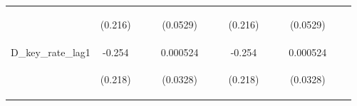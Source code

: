 \documentclass[]{article}
\begin{document}
\begin{center}
\begin{tabular}{lcccccccccccc}
\vspace{4pt} & \begin{footnotesize}(0.216)\end{footnotesize} & \begin{footnotesize}\end{footnotesize} & \begin{footnotesize}\end{footnotesize} & \begin{footnotesize}(0.0529)\end{footnotesize} & \begin{footnotesize}\end{footnotesize} & \begin{footnotesize}\end{footnotesize} & \begin{footnotesize}(0.216)\end{footnotesize} & \begin{footnotesize}\end{footnotesize} & \begin{footnotesize}\end{footnotesize} & \begin{footnotesize}(0.0529)\end{footnotesize} & \begin{footnotesize}\end{footnotesize} & \begin{footnotesize}\end{footnotesize} \\
D\_key\_rate\_lag1 & -0.254 &  &  & 0.000524 &  &  & -0.254 &  &  & 0.000524 &  &  \\
\vspace{4pt} & \begin{footnotesize}(0.218)\end{footnotesize} & \begin{footnotesize}\end{footnotesize} & \begin{footnotesize}\end{footnotesize} & \begin{footnotesize}(0.0328)\end{footnotesize} & \begin{footnotesize}\end{footnotesize} & \begin{footnotesize}\end{footnotesize} & \begin{footnotesize}(0.218)\end{footnotesize} & \begin{footnotesize}\end{footnotesize} & \begin{footnotesize}\end{footnotesize} & \begin{footnotesize}(0.0328)\end{footnotesize} & \begin{footnotesize}\end{footnotesize} & \begin{footnotesize}\end{footnotesize} \\

\end{tabular}
\end{center}
\end{document}
